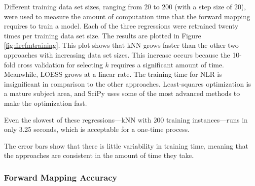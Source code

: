 Different training data set sizes, ranging from 20 to 200 (with a step size of 20), were used to measure the amount of computation time that the forward mapping requires to train a model.
Each of the three regressions were retrained twenty times per training data set size.
The results are plotted in Figure \ref{fig:firefmtraining}.
This plot shows that kNN grows faster than the other two approaches with increasing data set sizes.
This increase occurs because the 10-fold cross validation for selecting $k$ requires a significant amount of time.
Meanwhile, LOESS grows at a linear rate.
The training time for NLR is insignificant in comparison to the other approaches.
Least-squares optimization is a mature subject area, and SciPy uses some of the most advanced methods to make the optimization fast.

Even the slowest of these regressions---kNN with 200 training instances---runs in only 3.25 seconds, which is acceptable for a one-time process.


The error bars show that there is little variability in training time, meaning that the approaches are consistent in the amount of time they take.


\subsubsection{Forward Mapping Accuracy}

